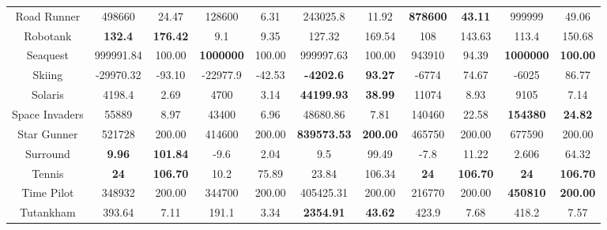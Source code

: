 \documentclass[nohyperref]{article}
\newcommand{\best}[1]{\textbf{#1}}
\theoremstyle{plain}
\begin{document}
\begin{table}[!hb]
\begin{center}
\begin{tabular}{ |c| c c| c c| c c| c c| c c| }
 Road Runner        & 498660            & 24.47             & 128600          & 6.31           & 243025.8             &11.92                     &\best{878600}     &\textbf{43.11}     &999999          &49.06\\
 Robotank           & \textbf{132.4}    & \textbf{176.42}   & 9.1             & 9.35           &127.32                &169.54                    &108               &143.63             &113.4           &150.68\\
 Seaquest           & 999991.84         & 100.00            & \textbf{1000000}& 100.00         &999997.63             &100.00                    &943910	        &94.39              &\textbf{1000000}&\textbf{100.00}\\
 Skiing             & -29970.32         & -93.10            & -22977.9        & -42.53         & \textbf{-4202.6}     &\textbf{93.27}            &-6774             &74.67              &-6025	         &86.77\\
 Solaris            & 4198.4            & 2.69              & 4700            & 3.14           & \textbf{44199.93}    &\textbf{38.99}            &11074             &8.93               &9105            &7.14\\
 Space Invaders     & 55889             & 8.97              & 43400           & 6.96           & 48680.86             &7.81                      &140460            &22.58              &\textbf{154380} &\textbf{24.82}\\
 Star Gunner        & 521728            & 200.00            & 414600          & 200.00         &\textbf{839573.53}    &\textbf{200.00}           &465750            &200.00             &677590          &200.00\\
 Surround           & \textbf{9.96}     & \textbf{101.84}   & -9.6            & 2.04           & 9.5                  &99.49                     &-7.8              &11.22              &2.606           &64.32\\
 Tennis             & \textbf{24}       & \textbf{106.70}   & 10.2            & 75.89          & 23.84                &106.34                    &\textbf{24}       &\textbf{106.70}    &\textbf{24}     &\textbf{106.70}\\
 Time Pilot         & 348932            & 200.00            & 344700          & 200.00         &405425.31             &200.00                    &216770            &200.00             &\textbf{450810} &\textbf{200.00}\\
 Tutankham          & 393.64            & 7.11              & 191.1           & 3.34           & \textbf{2354.91}     &\textbf{43.62}            &423.9             &7.68               &418.2           &7.57\\

\end{tabular}
\end{center}
\end{table}
\end{document}
